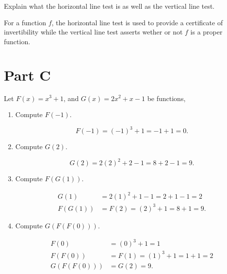 \documentclass[12pt]{article} %
\begin{document}
\vspace*{2cm}

\begin{qstn}
  Explain what the horizontal line test is as well as the vertical line test.
  \begin{solution}
    For a function $f$, the horizontal line test is used to provide a certificate of invertibility while the
    vertical line test asserts wether or not $f$ is a proper function.
  \end{solution}
\end{qstn}

\newpage

\section*{Part C}

\begin{qstn}
  Let $F(x) = x^3  + 1$, and $G(x) = 2x^2 + x - 1$ be functions,
  \begin{enumerate}[label=(\alph*)]
    \item Compute $F(-1)$.
      \begin{solution}
        \[
              F(-1) = (-1)^{3} + 1 = -1 + 1 = 0
        .\] 
      \end{solution}
      \vspace*{1cm}

    \item Compute  $G(2)$. 
      \begin{solution}
        \[
              G(2) = 2(2)^2 + 2 - 1 = 8 + 2 - 1 = 9
        .\] 
      \end{solution}
      \vspace*{1cm}

    \item Compute $F(G(1))$. 
      \begin{solution}
        \begin{align*}
          G(1) &= 2(1)^2 + 1 - 1 = 2 + 1 - 1 = 2\\
          F(G(1)) &= F(2) = (2)^3 + 1 = 8 + 1 = 9
        .\end{align*}
      \end{solution}
      \vspace*{1cm}

    \item Compute $G(F(F(0)))$.
      \begin{solution}
        \begin{align*}
          F(0) &= (0)^3 + 1 = 1\\
          F(F(0)) &= F(1) = (1)^3 + 1 = 1 + 1 = 2\\
          G(F(F(0))) &= G(2) = 9
        .\end{align*}
      \end{solution}
  \end{enumerate}
\end{qstn}
\end{document}
